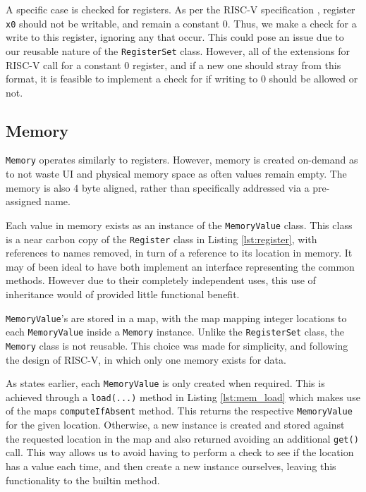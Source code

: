 A specific case is checked for registers. As per the RISC-V specification \cite{riscv_2015_riscv}, register \verb|x0| should not be writable, and remain a constant 0. Thus, we make a check for a write to this register, ignoring any that occur. This could pose an issue due to our reusable nature of the \texttt{RegisterSet} class. However, all of the extensions for RISC-V call for a constant 0 register, and if a new one should stray from this format, it is feasible to implement a check for if writing to 0 should be allowed or not.

\subsection{Memory}
\texttt{Memory} operates similarly to registers. However, memory is created on-demand as to not waste \ac{UI} and physical memory space as often values remain empty. The memory is also 4 byte aligned, rather than specifically addressed via a pre-assigned name.

Each value in memory exists as an instance of the \texttt{MemoryValue} class. This class is a near carbon copy of the \texttt{Register} class in Listing \ref{lst:register}, with references to names removed, in turn of a reference to its location in memory. It may of been ideal to have both implement an interface representing the common methods. However due to their completely independent uses, this use of inheritance would of provided little functional benefit.

\texttt{MemoryValue}'s are stored in a map, with the map mapping integer locations to each \texttt{MemoryValue} inside a \texttt{Memory} instance. Unlike the \texttt{RegisterSet} class, the \texttt{Memory} class is not reusable. This choice was made for simplicity, and following the design of RISC-V, in which only one memory exists for data. 

As states earlier, each \texttt{MemoryValue} is only created when required. This is achieved through a \texttt{load(...)} method in Listing \ref{lst:mem_load} which makes use of the maps \texttt{computeIfAbsent} method. This returns the respective \texttt{MemoryValue} for the given location. Otherwise, a new instance is created and stored against the requested location in the map and also returned avoiding an additional \texttt{get()} call. This way allows us to avoid having to perform a check to see if the location has a value each time, and then create a new instance ourselves, leaving this functionality to the builtin method.

